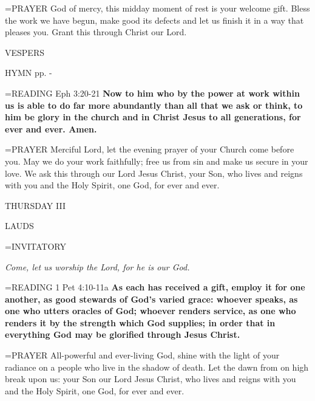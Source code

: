\hangindent=\parindent \small{PRAYER  God of mercy, this midday moment of rest is your welcome gift. Bless the work we have begun, make good its defects and let us finish it in a way that pleases you. Grant this through Christ our Lord.}

\begin{flushleft}\normalsize VESPERS\\\end{flushleft}

HYMN pp. \pageref{ordinaryTime:fourthHymn} - \pageref{ordinaryTime:sixthHymn}

\hangindent=\parindent \small{READING} Eph 3:20-21 \textbf{Now to him who by the power at work within us is able to do far more abundantly than all that we ask or think, to him be glory in the church and in Christ Jesus to all generations, for ever and ever. Amen.\\}

\hangindent=\parindent \small{PRAYER  Merciful Lord, let the evening prayer of your Church come before you. May we do your work faithfully; free us from sin and make us secure in your love. We ask this through our Lord Jesus Christ, your Son, who lives and reigns with you and the Holy Spirit, one God, for ever and ever.}

\begin{center}
\normalsize THURSDAY III
\end{center}

\begin{flushleft}\normalsize LAUDS\\\end{flushleft}

\hangindent=\parindent \small{INVITATORY}
\begin{center}
\textit{Come, let us worship the Lord, for he is our God.\\}
\end{center}

\hangindent=\parindent \small{READING} 1 Pet 4:10-11a \textbf{As each has received a gift, employ it for one another, as good stewards of God’s varied grace: whoever speaks, as one who utters oracles of God; whoever renders service, as one who renders it by the strength which God supplies; in order that in everything God may be glorified through Jesus Christ.  \\}

\hangindent=\parindent \small{PRAYER  All-powerful and ever-living God, shine with the light of your radiance on a people who live in the shadow of death. Let the dawn from on high break upon us: your Son our Lord Jesus Christ, who lives and reigns with you and the Holy Spirit, one God, for ever and ever.}

